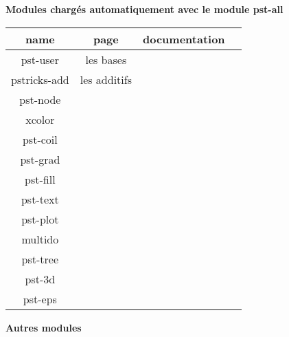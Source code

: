 \textbf{Modules chargés automatiquement avec le module pst-all}

\begin{tabular}{|c|c|c|c|}\hline 
name				&  page 				& documentation  \footnotemark[1]\\ \hline 
pst-user			& les bases				& \cite{pst-user} \\
pstricks-add 		& les additifs		 	& \cite{pstricks-add} \\ %
pst-node 			& \pageref{pst-node} 	& \cite{pst-node} \\ %
xcolor				& \pageref{xcolor} 		& \cite{xcolor} \\ %
pst-coil 			& \pageref{pst-coil}	& \cite{pst-coil}\\ %
pst-grad			& \pageref{pst-grad}	& \cite{pst-grad} \\ %
pst-fill 			& \pageref{pst-fill}	& \cite{pst-fill}\\ %
pst-text			& \pageref{pst-text} 	& \cite{pst-text} \\ %
pst-plot 			& \pageref{pst-plot}	& \cite{pst-plot} \\ %

multido 			& \pageref{multido} 	&\cite{multido} \\ %
pst-tree			& \pageref{pst-tree}	& \cite{pst-tree} \\ %
pst-3d 				&		 				& \\ %
pst-eps 			&  						& \\ %
\hline 
\end{tabular}  

\bigskip
\textbf{Autres modules}

